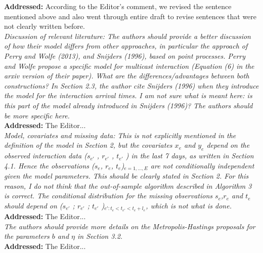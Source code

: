 \documentclass[12pt]{article}
\newcommand{\grey}[1]{{\color{mygrey}#1}}
\theoremstyle{definition}
\begin{document}
\noindent \textcolor{MyGreen}{\textbf{Addressed:}} According to the Editor's comment, we revised the sentence mentioned above and also went through entire draft to revise sentences that were not clearly written before. \\


 \grey{\emph{ Discussion of relevant literature: The authors should provide a better discussion of how their model differs from other approaches, in particular the approach of Perry and Wolfe (2013), and Snijders (1996), based on point processes. Perry and Wolfe propose a specific model for multicast interaction (Equation (6) in the arxiv version of their paper). What are the differences/advantages between both constructions? In Section 2.3, the author cite Snijders (1996) when they introduce the model for the interaction arrival times. I am not sure what is meant here: is this part of the model already introduced in Snijders (1996)? The authors should be more specific here.}}\\

\noindent \textcolor{MyGreen}{\textbf{Addressed:}} The Editor... \\

 \grey{\emph{ Model, covariates and missing data: This is not explicitly mentioned in the definition of the model in Section 2, but the covariates $x_e$ and $y_e$ depend on the observed interaction data ($s_{e'}$ , $r_{e'}$ , $t_{e'}$ ) in the last 7 days, as written in Section 4.1. Hence the observations ($s_e$, $r_e$, $t_e$)$_{e=1,...,E}$ are not conditionally independent given the model parameters. This should be clearly stated in Section 2. For this reason, I do not think that the out-of-sample algorithm described in Algorithm 3 is correct. The conditional distribution for the missing observations $s_e$,$r_e$ and $t_e$ should depend on ($s_{e'}$ ; $r_{e'}$ ; $t_{e'}$ )$_{e': t_e < t_{e'} < t_{e} + l_e }$, which is not what is done. }}\\

\noindent \textcolor{MyGreen}{\textbf{Addressed:}} The Editor... \\

 \grey{\emph{The authors should provide more details on the Metropolis-Hastings
proposals for the parameters $b$ and $\eta$ in Section 3.2. }}\\

\noindent \textcolor{MyGreen}{\textbf{Addressed:}} The Editor... \\
\end{document}
